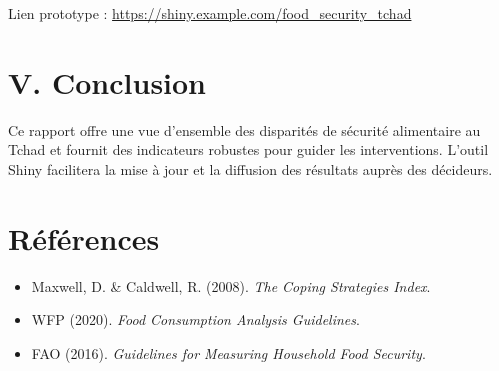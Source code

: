 \documentclass[
]{article}
\providecommand{\tightlist}{%
  \setlength{\itemsep}{0pt}\setlength{\parskip}{0pt}}
\begin{document}
Lien prototype : \url{https://shiny.example.com/food_security_tchad}

\newpage

\hypertarget{v.-conclusion}{%
\section{V. Conclusion}\label{v.-conclusion}}

Ce rapport offre une vue d'ensemble des disparités de sécurité
alimentaire au Tchad et fournit des indicateurs robustes pour guider les
interventions. L'outil Shiny facilitera la mise à jour et la diffusion
des résultats auprès des décideurs.

\newpage

\hypertarget{ruxe9fuxe9rences}{%
\section{Références}\label{ruxe9fuxe9rences}}

\begin{itemize}
\tightlist
\item
  Maxwell, D. \& Caldwell, R. (2008). \emph{The Coping Strategies
  Index}.
\item
  WFP (2020). \emph{Food Consumption Analysis Guidelines}.
\item
  FAO (2016). \emph{Guidelines for Measuring Household Food Security}.
\end{itemize}
\end{document}
